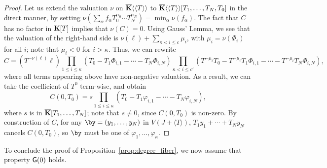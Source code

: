 \documentclass[12pt]{article}
\begin{document}
\begin{proof}
  Let us extend the valuation $\nu$ on $\overline{\mathbf{K}}\langle\langle T\rangle\rangle$
to $\overline{\mathbf{K}}\langle\langle T \rangle\rangle[T_1,\dots,T_N,T_0]$ in the
  direct manner, by setting $\nu(\sum_\alpha f_\alpha T_0^{\alpha_0}
  \cdots T_N^{\alpha_N}) = \min_\alpha \nu(f_\alpha)$. The fact that
  $C$ has no factor in $\mathbf{K}[T]$ implies that
  $\nu(C)=0$. Using Gauss' Lemma, we see that the valuation of the
  right-hand side is $\nu(\ell) + \sum_{\kappa < i \le c}\mu_i$, with $\mu_i= \nu(\Phi_i)$ for all $i$;
  note that $\mu_i < 0$ for $i > \kappa$. Thus, we can
  rewrite
  $$C =\left ({T}^{-\nu(\ell)} \ell\right ) 
  \prod_{1 \le i \le \kappa}(T_0-T_1 \Phi_{i,1} - \cdots - T_N  \Phi_{i,N} )
  \prod_{\kappa < i \le c'} ({T}^{-\mu_i}T_0-{T}^{-\mu_i}T_1 \Phi_{i,1} - \cdots - {T}^{-\mu_i}T_N  \Phi_{i,N} ),$$
  where all terms appearing above have non-negative valuation.
  As a result, we can take the coefficient of ${T}^0$ term-wise,
  and obtain
  $$C(0,T_0) = s \prod_{1 \le i \le \kappa}(T_0-T_1 \varphi_{i,1} -
  \cdots - T_N \varphi_{i,N} ),$$ where $s$ is in $\overline{\mathbf{K}}[T_1,\dots,T_N]$;
  note that $s \ne 0$, since $C(0,T_0)$ is non-zero.
 By construction of $C$, for any
  $\by=(y_1,\dots,y_N)$ in $V(J+\langle T \rangle)$, $T_1 y_1 + \cdots + T_N y_N$
  cancels $C(0,T_0)$, so $\by$ must be one of
  $\varphi_1,\dots,\varphi_{\kappa}$.
\end{proof}

To conclude the proof of Proposition~\ref{prop:degree_fiber}, 
we now assume that property ${\sf G}(0)$ holds.
\end{document}
